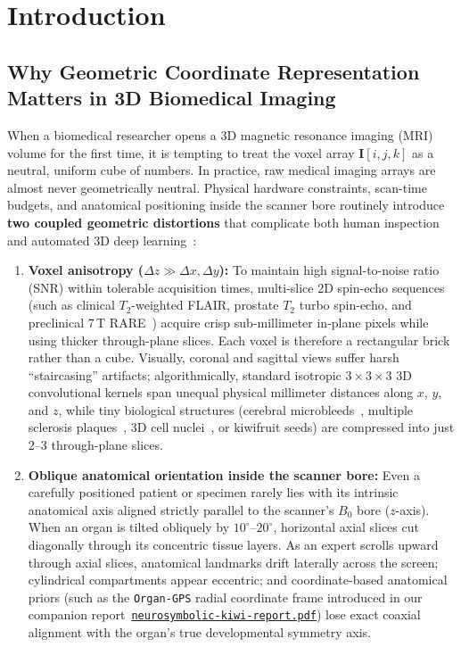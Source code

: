 \documentclass[10pt,a4paper]{article}
\renewcommand{\_}{\origunderscore\allowbreak}
\newcommand{\ghblob}{https://github.com/arvidl/BMED365-2027/blob/main}
\newcommand{\repodir}{Lab4-Comp-Imag/Kiwi-challenge/docs/neurosymbolic-report}
\newcommand{\natrep}{\href{\ghblob/\repodir/neurosymbolic-kiwi-report.pdf}{\texttt{neurosymbolic-\allowbreak kiwi-\allowbreak report.pdf}}}
\begin{document}
\clearpage
\section{Introduction}
\label{sec:intro}

\subsection{Why Geometric Coordinate Representation Matters in 3D Biomedical Imaging}
\label{sec:intro_geom}

When a biomedical researcher opens a 3D magnetic resonance imaging (MRI) volume for the first time, it is tempting to treat the voxel array $\mathbf{I}[i, j, k]$ as a neutral, uniform cube of numbers. In practice, raw medical imaging arrays are almost never geometrically neutral. Physical hardware constraints, scan-time budgets, and anatomical positioning inside the scanner bore routinely introduce \textbf{two coupled geometric distortions} that complicate both human inspection and automated 3D deep learning~\cite{hill2001registration,fischl2012freesurfer,isensee2021nnunet}:

\begin{enumerate}
    \item \textbf{Voxel anisotropy ($\Delta z \gg \Delta x, \Delta y$):} To maintain high signal-to-noise ratio (SNR) within tolerable acquisition times, multi-slice 2D spin-echo sequences (such as clinical $T_2$-weighted FLAIR, prostate $T_2$ turbo spin-echo, and preclinical 7\,T RARE~\cite{hennig1986rare}) acquire crisp sub-millimeter in-plane pixels while using thicker through-plane slices. Each voxel is therefore a rectangular brick rather than a cube. Visually, coronal and sagittal views suffer harsh ``staircasing'' artifacts; algorithmically, standard isotropic $3\times 3\times 3$ 3D convolutional kernels span unequal physical millimeter distances along $x$, $y$, and $z$, while tiny biological structures (cerebral microbleeds~\cite{greenberg2009cmb}, multiple sclerosis plaques~\cite{thompson2018mcdonald}, 3D cell nuclei~\cite{weigert2020stardist3d,stringer2021cellpose}, or kiwifruit seeds) are compressed into just $2\text{--}3$ through-plane slices.
    \item \textbf{Oblique anatomical orientation inside the scanner bore:} Even a carefully positioned patient or specimen rarely lies with its intrinsic anatomical axis aligned strictly parallel to the scanner's $B_0$ bore ($z$-axis). When an organ is tilted obliquely by $10^\circ\text{--}20^\circ$, horizontal axial slices cut diagonally through its concentric tissue layers. As an expert scrolls upward through axial slices, anatomical landmarks drift laterally across the screen; cylindrical compartments appear eccentric; and coordinate-based anatomical priors (such as the \texttt{Organ-GPS} radial coordinate frame introduced in our companion report~\natrep{}) lose exact coaxial alignment with the organ's true developmental symmetry axis.
\end{enumerate}
\end{document}
